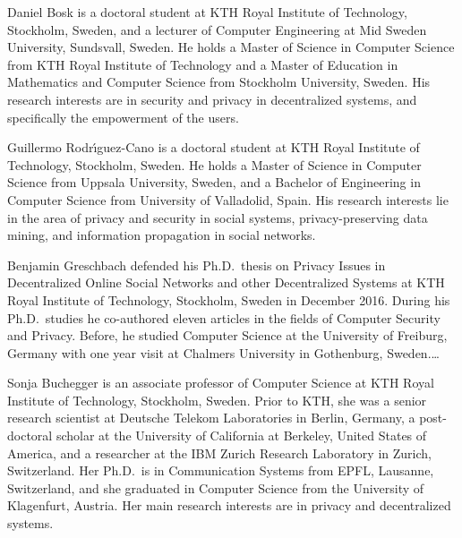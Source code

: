 Daniel Bosk is a doctoral student at KTH Royal Institute of Technology, 
Stockholm, Sweden, and a lecturer of Computer Engineering at Mid Sweden 
University, Sundsvall, Sweden.
He holds a Master of Science in Computer Science from KTH Royal Institute of 
Technology and a Master of Education in Mathematics and Computer Science from 
Stockholm University, Sweden.
His research interests are in security and privacy in decentralized systems, 
and specifically the empowerment of the users.

Guillermo Rodr\'{\i}guez-Cano is a doctoral student at KTH Royal Institute of 
Technology, Stockholm, Sweden.
He holds a Master of Science in Computer Science from Uppsala University, 
Sweden, and a Bachelor of Engineering in Computer Science from University of 
Valladolid, Spain.
His research interests lie in the area of privacy and security in social 
systems, privacy-preserving data mining, and information propagation in 
social networks.

Benjamin Greschbach defended his Ph.D.\ thesis on Privacy Issues in Decentralized 
Online Social Networks and other Decentralized Systems at KTH Royal Institute 
of Technology, Stockholm, Sweden in December 2016. During his Ph.D.\ studies he 
co-authored eleven articles in the fields of Computer Security and Privacy. 
Before, he studied Computer Science at the University of Freiburg, Germany 
with one year visit at Chalmers University in Gothenburg, Sweden.\dots

Sonja Buchegger is an associate professor of Computer Science at KTH Royal 
Institute of Technology, Stockholm, Sweden.
Prior to KTH, she was a
senior research scientist at Deutsche Telekom Laboratories in Berlin, Germany,
a post-doctoral scholar at the University of California at Berkeley, United States of America, 
and a researcher at the IBM Zurich Research Laboratory in Zurich, Switzerland.
Her Ph.D.\ is in Communication Systems from EPFL, Lausanne, Switzerland, and 
she graduated in Computer Science from the University of Klagenfurt, Austria.
Her main research interests are in privacy and decentralized systems.
